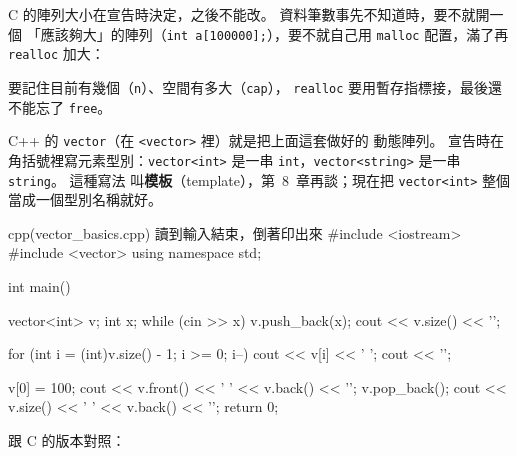 \begin{crecap}
C 的陣列大小在宣告時決定，之後不能改。 資料筆數事先不知道時，要不就開一個
「應該夠大」的陣列（\texttt{int a[100000];}），要不就自己用
\texttt{malloc} 配置，滿了再 \texttt{realloc} 加大：


要記住目前有幾個（\texttt{n}）、空間有多大（\texttt{cap}），
\texttt{realloc} 要用暫存指標接，最後還不能忘了 \texttt{free}。
\end{crecap}

C++ 的 \texttt{vector}（在 \texttt{<vector>} 裡）就是把上面這套做好的
動態陣列。 宣告時在角括號裡寫元素型別：\texttt{vector<int>} 是一串
\texttt{int}，\texttt{vector<string>} 是一串 \texttt{string}。 這種寫法
叫\textbf{模板}（template），第~8~章再談；現在把 \texttt{vector<int>}
整個當成一個型別名稱就好。

\begin{example}[label=ex:vector-basics]{cpp}{(vector\_basics.cpp) 讀到輸入結束，倒著印出來}
#include <iostream>
#include <vector>
using namespace std;

int main() {
    vector<int> v;
    int x;
    while (cin >> x) {
        v.push_back(x);
    }
    cout << v.size() << '\n';

    for (int i = (int)v.size() - 1; i >= 0; i--) {
        cout << v[i] << ' ';
    }
    cout << '\n';

    v[0] = 100;
    cout << v.front() << ' ' << v.back() << '\n';
    v.pop_back();
    cout << v.size() << ' ' << v.back() << '\n';
    return 0;
}
\end{example}


跟 C 的版本對照：

